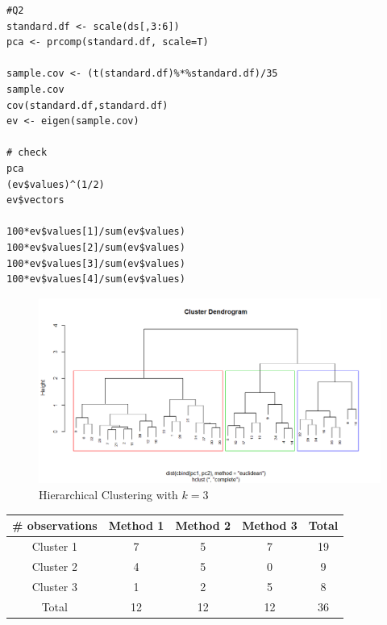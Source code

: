 \documentclass[12pt]{article}
\newenvironment{solution}[2][Solution]{\begin{trivlist}
\item[\hskip \labelsep {\bfseries #1}\hskip \labelsep {\bfseries #2.}]}{\end{trivlist}}
\newenvironment{question}[2][Question]{\begin{trivlist}
\item[\hskip \labelsep {\bfseries #1}\hskip \labelsep {\bfseries #2.}]}{\end{trivlist}}
\begin{document}
\begin{solution}[Solution]
\newpage
\begin{lstlisting}[caption=R code for Q2]
#Q2
standard.df <- scale(ds[,3:6])
pca <- prcomp(standard.df, scale=T)

sample.cov <- (t(standard.df)%*%standard.df)/35
sample.cov
cov(standard.df,standard.df)
ev <- eigen(sample.cov)

# check
pca
(ev$values)^(1/2)
ev$vectors

100*ev$values[1]/sum(ev$values)
100*ev$values[2]/sum(ev$values)
100*ev$values[3]/sum(ev$values)
100*ev$values[4]/sum(ev$values)
\end{lstlisting}
\end{solution}

\newpage
\begin{question}{3}
\end{question}
\begin{solution}[Solution]\\ 
\begin{figure}[http]
\centering
\includegraphics[scale=0.6]{Rplot}
\caption{Hierarchical Clustering with $k=3$}
\label{fig:cluster}
\end{figure}
\begin{center}
\begin{tabular}{ c|c c c|c } 
 \# observations & Method 1 & Method 2 & Method 3 & Total \\ \hline
 Cluster 1 & 7 & 5 & 7 & 19\\
 Cluster 2 & 4 & 5 & 0 & 9 \\
 Cluster 3 & 1 & 2 & 5 & 8\\ \hline
 Total  & 12 & 12 & 12 & 36\\ 
\end{tabular}
\end{center}


\end{solution}
\end{document}
